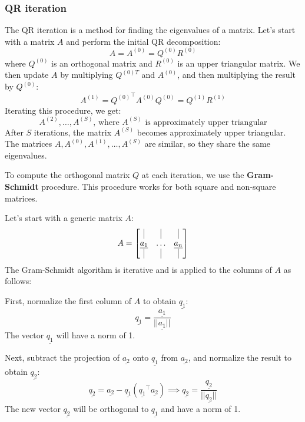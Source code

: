\subsubsection*{QR iteration}
The QR iteration is a method for finding the eigenvalues of a matrix. Let's start with a matrix $A$ and perform the initial QR decomposition:
\[
    A = A^{(0)} = Q^{(0)}R^{(0)}
\]
where $Q^{(0)}$ is an orthogonal matrix and $R^{(0)}$ is an upper triangular matrix. We then update $A$ by multiplying $Q^{(0)T}$ and $A^{(0)}$, and then multiplying the result by $Q^{(0)}$:
\[
    A^{(1)} = {Q^{(0)}}^{\intercal} A^{(0)} Q^{(0)} = Q^{(1)} R^{(1)}
\]
Iterating this procedure, we get:
\[
    A^{(2)}, \dots, A^{(S)} \text{, where } A^{(S)} \text{ is approximately upper triangular}
\]
After $S$ iterations, the matrix $A^{(S)}$ becomes approximately upper triangular. The matrices $A, A^{(0)}, A^{(1)}, \dots, A^{(S)}$ are similar, so they share the same eigenvalues.

To compute the orthogonal matrix $Q$ at each iteration, we use the \textbf{Gram-Schmidt} procedure. This procedure works for both square and non-square matrices.

Let's start with a generic matrix $A$:
\[
    A = \begin{bmatrix}
        \vline & \vline & \vline\\
        \underline{a_1} & \ldots & \underline{a_n}\\
        \vline & \vline & \vline
    \end{bmatrix}
\]
The Gram-Schmidt algorithm is iterative and is applied to the columns of $A$ as follows:

First, normalize the first column of $A$ to obtain $\underline{q_1}$:
\[
  \underline{q_1} = \frac{\underline{a_1}}{||\underline{a_1}||}
\]
The vector $\underline{q_1}$ will have a norm of 1.

Next, subtract the projection of $\underline{a_2}$ onto $\underline{q_1}$ from $\underline{a_2}$, and normalize the result to obtain $\underline{q_2}$:
\[
    \underline{q_2} = \underline{a_2} - \underline{q_1}(\underline{q_1}^\intercal \underline{a_2}) \implies \underline{q_2} = \dfrac{\underline{q_2}}{||\underline{q_2}||}
\]
The new vector $\underline{q_2}$ will be orthogonal to $\underline{q_1}$ and have a norm of 1.


